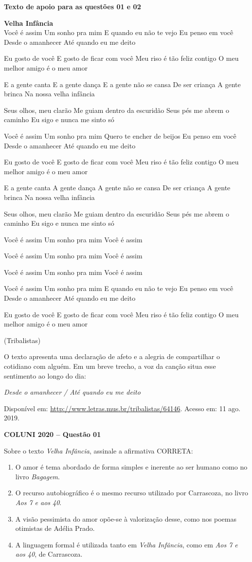 \textbf{Texto de apoio para as questões 01 e 02}\par\medskip
\textbf{Velha Infância}\\

Você é assim
Um sonho pra mim
E quando eu não te vejo
Eu penso em você
Desde o amanhecer
Até quando eu me deito

Eu gosto de você
E gosto de ficar com você
Meu riso é tão feliz contigo
O meu melhor amigo é o meu amor

E a gente canta
E a gente dança
E a gente não se cansa
De ser criança
A gente brinca
Na nossa velha infância

Seus olhos, meu clarão
Me guiam dentro da escuridão
Seus pés me abrem o caminho
Eu sigo e nunca me sinto só

Você é assim
Um sonho pra mim
Quero te encher de beijos
Eu penso em você
Desde o amanhecer
Até quando eu me deito

Eu gosto de você
E gosto de ficar com você
Meu riso é tão feliz contigo
O meu melhor amigo é o meu amor

E a gente canta
A gente dança
A gente não se cansa
De ser criança
A gente brinca
Na nossa velha infância

Seus olhos, meu clarão
Me guiam dentro da escuridão
Seus pés me abrem o caminho
Eu sigo e nunca me sinto só

Você é assim
Um sonho pra mim
Você é assim

Você é assim
Um sonho pra mim
Você é assim

Você é assim
Um sonho pra mim
Você é assim

Você é assim
Um sonho pra mim
E quando eu não te vejo
Eu penso em você
Desde o amanhecer
Até quando eu me deito

Eu gosto de você
E gosto de ficar com você
Meu riso é tão feliz contigo
O meu melhor amigo é o meu amor

(Tribalistas)

O texto apresenta uma declaração de afeto e a alegria de compartilhar o cotidiano com alguém. Em um breve trecho, a voz da canção situa esse sentimento ao longo do dia:
\begin{center}\textit{Desde o amanhecer / Até quando eu me deito}\end{center}
Disponível em: \url{http://www.letras.mus.br/tribalistas/64146}. Acesso em: 11 ago. 2019.

\textbf{COLUNI 2020 -- Questão 01}\par\medskip Sobre o texto \textit{Velha Infância}, assinale a afirmativa CORRETA:\begin{enumerate}
\item O amor é tema abordado de forma simples e inerente ao ser humano como no livro \textit{Bagagem}.
\item O recurso autobiográfico é o mesmo recurso utilizado por Carrascoza, no livro \textit{Aos 7 e aos 40}.
\item A visão pessimista do amor opõe-se à valorização desse, como nos poemas otimistas de Adélia Prado.
\item A linguagem formal é utilizada tanto em \textit{Velha Infância}, como em \textit{Aos 7 e aos 40}, de Carrascoza.\end{enumerate}